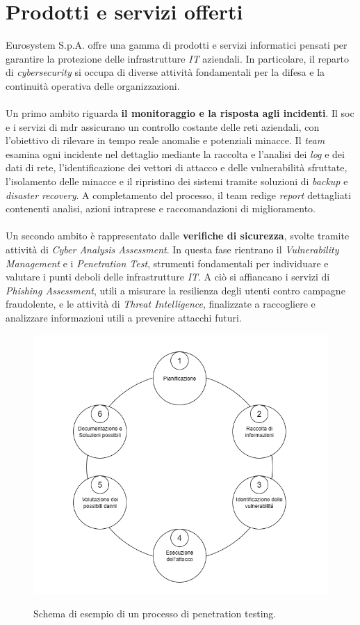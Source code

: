 \section{Prodotti e servizi offerti}  
Eurosystem S.p.A. offre una gamma di prodotti e servizi informatici pensati per garantire la protezione delle infrastrutture \textit{IT} aziendali. In particolare, il reparto di \textit{cybersecurity} si occupa di diverse attività fondamentali per la difesa e la continuità operativa delle organizzazioni.\\\\  
Un primo ambito riguarda \textbf{il monitoraggio e la risposta agli incidenti}. Il \gls{soc} e i servizi di \gls{mdr} assicurano un controllo costante delle reti aziendali, con l'obiettivo di rilevare in tempo reale anomalie e potenziali minacce. Il \textit{team} esamina ogni incidente nel dettaglio mediante la raccolta e l'analisi dei \textit{log} e dei dati di rete, l'identificazione dei vettori di attacco e delle vulnerabilità sfruttate, l'isolamento delle minacce e il ripristino dei sistemi tramite soluzioni di \textit{backup} e \textit{disaster recovery}. A completamento del processo, il team redige \textit{report} dettagliati contenenti analisi, azioni intraprese e raccomandazioni di miglioramento.\\\\  
Un secondo ambito è rappresentato dalle \textbf{verifiche di sicurezza}, svolte tramite attività di \textit{Cyber Analysis Assessment}. In questa fase rientrano il \textit{Vulnerability Management} e i \textit{Penetration Test}, strumenti fondamentali per individuare e valutare i punti deboli delle infrastrutture \textit{IT}. A ciò si affiancano i servizi di \textit{Phishing Assessment}, utili a misurare la resilienza degli utenti contro campagne fraudolente, e le attività di \textit{Threat Intelligence}, finalizzate a raccogliere e analizzare informazioni utili a prevenire attacchi futuri.  
\begin{figure}[H]
    \centering
    \includegraphics[alt={Schema Penetration Test}, width=0.95\columnwidth]{img/Pen_test.png}
    \caption{Schema di esempio di un processo di penetration testing.}
    \label{fig:pen_test}    
\end{figure}  

